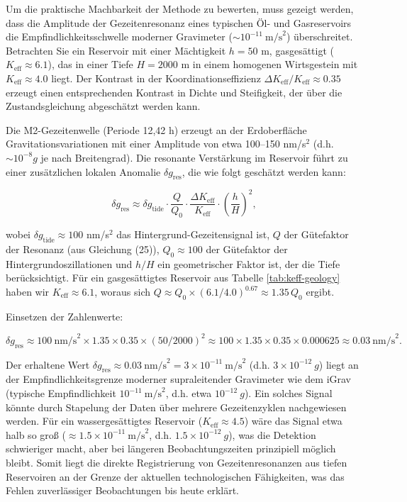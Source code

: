 \documentclass[12pt,a4paper]{article}
\theoremstyle{remark}
\newcommand{\Keff}{K_{\mathrm{eff}}}
\begin{document}
	Um die praktische Machbarkeit der Methode zu bewerten, muss gezeigt werden, dass die Amplitude der Gezeitenresonanz eines typischen Öl- und Gasreservoirs die Empfindlichkeitsschwelle moderner Gravimeter (\( \sim 10^{-11}\ \text{m/s}^2\)) überschreitet. Betrachten Sie ein Reservoir mit einer Mächtigkeit \(h = 50\) m, gasgesättigt (\(\Keff \approx 6.1\)), das in einer Tiefe \(H = 2000\) m in einem homogenen Wirtsgestein mit \(\Keff \approx 4.0\) liegt. Der Kontrast in der Koordinationseffizienz \(\Delta \Keff / \Keff \approx 0.35\) erzeugt einen entsprechenden Kontrast in Dichte und Steifigkeit, der über die Zustandsgleichung abgeschätzt werden kann.
	
	Die M2-Gezeitenwelle (Periode 12,42 h) erzeugt an der Erdoberfläche Gravitationsvariationen mit einer Amplitude von etwa 100–150 nm/s\(^2\) (d.h. \(\sim 10^{-8} g\) je nach Breitengrad). Die resonante Verstärkung im Reservoir führt zu einer zusätzlichen lokalen Anomalie \(\delta g_{\text{res}}\), die wie folgt geschätzt werden kann:
	
	\begin{equation}
		\delta g_{\text{res}} \approx \delta g_{\text{tide}} \cdot \frac{Q}{Q_0} \cdot \frac{\Delta \Keff}{\Keff} \cdot \left(\frac{h}{H}\right)^2,
		\label{eq:signal_estimate}
	\end{equation}
	
	wobei \(\delta g_{\text{tide}} \approx 100\) nm/s\(^2\) das Hintergrund-Gezeitensignal ist, \(Q\) der Gütefaktor der Resonanz (aus Gleichung (25)), \(Q_0 \approx 100\) der Gütefaktor der Hintergrundoszillationen und \(h/H\) ein geometrischer Faktor ist, der die Tiefe berücksichtigt. Für ein gasgesättigtes Reservoir aus Tabelle \ref{tab:keff-geology} haben wir \(\Keff \approx 6.1\), woraus sich \(Q \approx Q_0 \times (6.1/4.0)^{0.67} \approx 1.35\,Q_0\) ergibt.
	
	Einsetzen der Zahlenwerte:
	
	\[
	\delta g_{\text{res}} \approx 100\ \text{nm/s}^2 \times 1.35 \times 0.35 \times (50/2000)^2 \approx 100 \times 1.35 \times 0.35 \times 0.000625 \approx 0.03\ \text{nm/s}^2.
	\]
	
	Der erhaltene Wert \(\delta g_{\text{res}} \approx 0.03\ \text{nm/s}^2 = 3 \times 10^{-11}\ \text{m/s}^2\) (d.h. \(3 \times 10^{-12}\ g\)) liegt an der Empfindlichkeitsgrenze moderner supraleitender Gravimeter wie dem iGrav (typische Empfindlichkeit \(10^{-11}\ \text{m/s}^2\), d.h. etwa \(10^{-12}\ g\)). Ein solches Signal könnte durch Stapelung der Daten über mehrere Gezeitenzyklen nachgewiesen werden. Für ein wassergesättigtes Reservoir (\(\Keff \approx 4.5\)) wäre das Signal etwa halb so groß (\( \approx 1.5\times10^{-11}\ \text{m/s}^2\), d.h. \(1.5\times10^{-12}\ g\)), was die Detektion schwieriger macht, aber bei längeren Beobachtungszeiten prinzipiell möglich bleibt. Somit liegt die direkte Registrierung von Gezeitenresonanzen aus tiefen Reservoiren an der Grenze der aktuellen technologischen Fähigkeiten, was das Fehlen zuverlässiger Beobachtungen bis heute erklärt.
	
\end{document}
